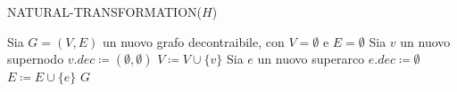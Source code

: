 \begin{algorithm}[H] 
    \begin{algorithmic}[1]
        \caption{NATURAL-TRANSFORMATION($H$)}\label{alg:natural-transformation}
        \State Sia $G = (V, E)$ un nuovo grafo decontraibile, con $V = \emptyset$ e $E = \emptyset$
            \State Sia $v$ un nuovo supernodo
            \State $v.dec \coloneqq (\emptyset, \emptyset)$
            \State $V \coloneqq V \cup \{v\}$
        \EndFor
            \State Sia $e$ un nuovo superarco
            \State $e.dec \coloneqq \emptyset$
            \State $E \coloneqq E \cup \{e\}$
        \EndFor
        \State \Return $G$
    \end{algorithmic}
\end{algorithm}